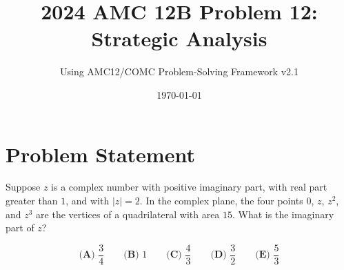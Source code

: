 \documentclass[12pt]{article}
\title{\textbf{2024 AMC 12B Problem 12:\\Strategic Analysis}}
\author{Using AMC12/COMC Problem-Solving Framework v2.1}
\date{\today}
\begin{document}
\maketitle

\section*{Problem Statement}

Suppose $z$ is a complex number with positive imaginary part, with real part greater than $1$, and with $|z| = 2$. In the complex plane, the four points $0$, $z$, $z^2$, and $z^3$ are the vertices of a quadrilateral with area $15$. What is the imaginary part of $z$?

\[
\textbf{(A) } \frac{3}{4} \qquad 
\textbf{(B) } 1 \qquad 
\textbf{(C) } \frac{4}{3} \qquad 
\textbf{(D) } \frac{3}{2} \qquad 
\textbf{(E) } \frac{5}{3}
\]

\vspace{1em}
\end{document}
